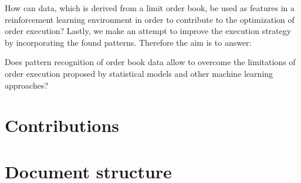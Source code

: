 How can data, which is derived from a limit order book, be used as features in a reinforcement learning environment in order to contribute to the optimization of order execution?
Lastly, we make an attempt to improve the execution strategy by incorporating the found patterns. Therefore the aim is to answer:

Does pattern recognition of order book data allow to overcome the limitations of order execution proposed by statistical models and other machine learning approaches?


\section{Contributions}

\section{Document structure}

